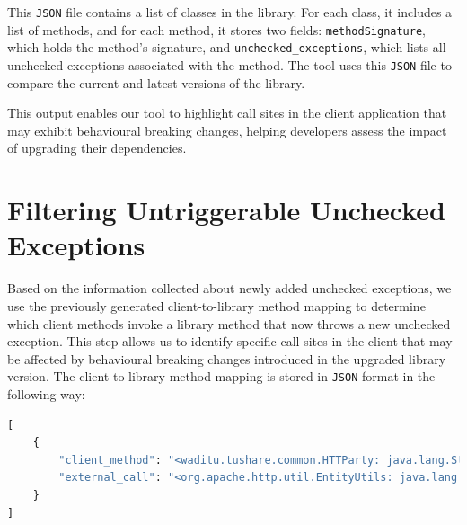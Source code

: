 This \texttt{JSON} file contains a list of classes in the library. For each class, it includes a list of methods, and for each method, it stores two fields: \texttt{methodSignature}, which holds the method’s signature, and \texttt{unchecked\_exceptions}, which lists all unchecked exceptions associated with the method. The tool uses this \texttt{JSON} file to compare the current and latest versions of the library.


This output enables our tool to highlight call sites in the client application that may exhibit behavioural breaking changes, helping developers assess the impact of upgrading their dependencies.

\section{Filtering Untriggerable Unchecked Exceptions}

Based on the information collected about newly added unchecked exceptions, we use the previously generated client-to-library method mapping to determine which client methods invoke a library method that now throws a new unchecked exception. This step allows us to identify specific call sites in the client that may be affected by behavioural breaking changes introduced in the upgraded library version. The client-to-library method mapping is stored in \texttt{JSON} format in the following way:

\begin{lstlisting}[language=python]
[
    {
        "client_method": "<waditu.tushare.common.HTTParty: java.lang.String get(java.lang.String,java.lang.String)>",
        "external_call": "<org.apache.http.util.EntityUtils: java.lang.String toString(org.apache.http.HttpEntity,java.lang.String)>"
    }
]
\end{lstlisting}

